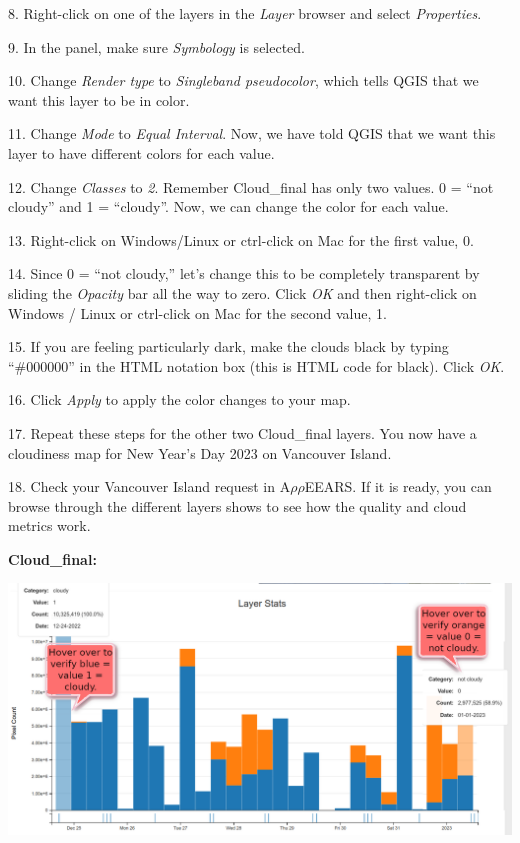\documentclass[oneside,a4paper,11pt,explicit]{book}
\begin{document}
	8. Right-click on one of the layers in the \textit{Layer} browser and select \textit{Properties}.
	
	9. In the panel, make sure \textit{Symbology} is selected.
	
	10. Change \textit{Render type} to \textit{Singleband pseudocolor}, which tells QGIS that we want this layer to be in color.
	
	11. Change \textit{Mode} to \textit{Equal Interval}. Now, we have told QGIS that we want this layer to have different colors for each value. 
	
	12. Change \textit{Classes} to \textit{2}. Remember Cloud\_final has only two values. 0 = ``not cloudy'' and 1 = ``cloudy''. Now, we can change the color for each value.
	
	13. Right-click on Windows/Linux or ctrl-click on Mac for the first value, 0. 
	
	14. Since 0 = ``not cloudy,'' let's change this to be completely transparent by sliding the \textit{Opacity} bar all the way to zero. Click \textit{OK} and then right-click on Windows / Linux or ctrl-click on Mac for the second value, 1. 
	
	15. If you are feeling particularly dark, make the clouds black by typing ``\#000000'' in the HTML notation box (this is HTML code for black). Click \textit{OK}.
	
	16. Click \textit{Apply} to apply the color changes to your map.
	
	17. Repeat these steps for the other two Cloud\_final layers. You now have a cloudiness map for New Year's Day 2023 on Vancouver Island.
	
	18. Check your Vancouver Island request in A$\rho\rho$EEARS. If it is ready, you can browse through the different layers shows to see how the quality and cloud metrics work. 
	
	\textbf{Cloud\_final:}
	
	\centerline{\includegraphics[width=.85\textwidth]{Cloud_final_Layer.png}}
	
\end{document}
